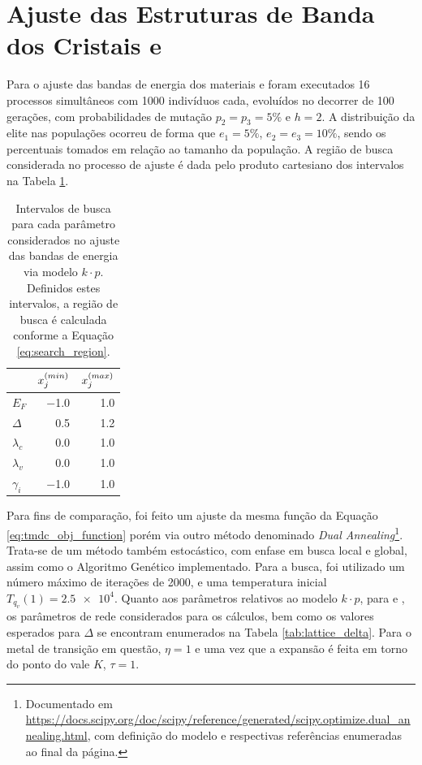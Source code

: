 \section{Ajuste das Estruturas de Banda dos Cristais  e }
\label{sec_resultados_tmdcs}

Para o ajuste das bandas de energia dos materiais  e  foram
executados 16 processos simultâneos com 1000 indivíduos cada, evoluídos no
decorrer de 100 gerações, com probabilidades de mutação $ p_2 = p_3 = 5\% $ e
$ h = 2 $. A distribuição da elite nas populações ocorreu de forma que $ e_1 =
  5\% $, $ e_2 = e_3 = 10\% $, sendo os percentuais tomados em relação ao tamanho
da população. A região de busca considerada no processo de ajuste é dada pelo
produto cartesiano dos intervalos na Tabela \ref{tab:search_region}.

\begin{table}[h]
  \centering
  \begin{tabular}{lrr}
    \toprule
                & $x^{(min)}_{j}$ & $x^{(max)}_{j}$ \\
    \midrule
    $E_F$       & \num{-1.0} & \num{1.0}  \\
    $\Delta$    & \num{0.5}  & \num{1.2}  \\
    $\lambda_c$ & \num{0.0}  & \num{1.0}  \\
    $\lambda_v$ & \num{0.0}  & \num{1.0}  \\
    $\gamma_i$  & \num{-1.0} & \num{1.0}  \\
    \bottomrule
  \end{tabular}
  \caption{
    Intervalos de busca para cada parâmetro considerados no ajuste das bandas de
    energia via modelo $ k \cdot p $. Definidos estes intervalos, a região de
    busca é calculada conforme a Equação \ref{eq:search_region}.
  }
  \label{tab:search_region}
\end{table}

Para fins de comparação, foi feito um ajuste da mesma função da Equação
\ref{eq:tmdc_obj_function} porém via outro método denominado
\textit{Dual Annealing}\footnote{
  Documentado em 
  \url{https://docs.scipy.org/doc/scipy/reference/generated/scipy.optimize.dual_annealing.html},
  com definição do modelo e respectivas referências enumeradas ao final da página.
}. Trata-se de um método também estocástico, com enfase em busca local e global,
assim como o Algoritmo Genético implementado. Para a busca, foi utilizado um
número máximo de iterações de 2000, e uma temperatura inicial 
$ T_{q_v}(1) = \num{2.5e4} $. Quanto aos parâmetros relativos ao modelo $k \cdot p$, para
 e , os parâmetros de rede considerados para os cálculos, bem
como os valores esperados para $ \Delta $ se encontram enumerados na Tabela
\ref{tab:lattice_delta}. Para o metal de transição em questão, $ \eta = 1 $ e
uma vez que a expansão é feita em torno do ponto do vale $K$, $ \tau = 1 $.

